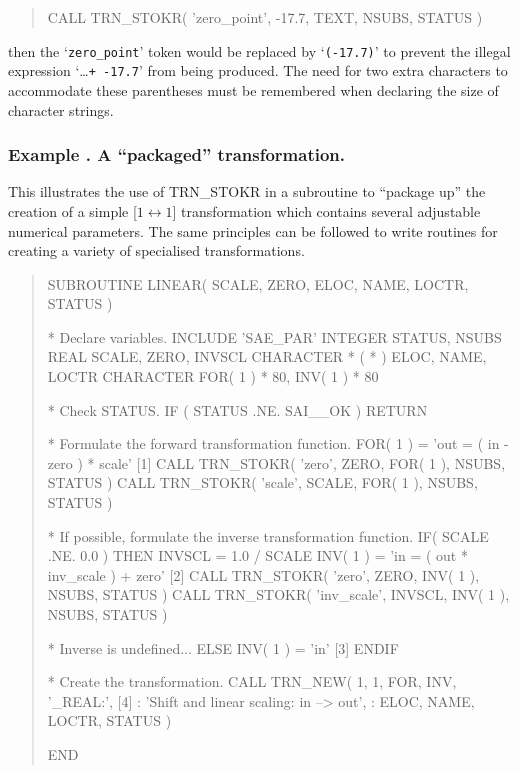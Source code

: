 \documentclass[twoside,nolof,11pt]{starlink}
\providecommand{\name}[1]{\small{#1}}
\newcounter{examplecounter}
\providecommand{\example}[1]{\addtocounter{examplecounter}{1}
                         \subsubsection*{Example \theexamplecounter. #1}}
\begin{document}
\begin{quote}
\begin{terminalv}
CALL TRN_STOKR( 'zero_point', -17.7, TEXT, NSUBS, STATUS )
\end{terminalv}
\end{quote}

then the `\verb#zero_point#' token would be replaced by `\verb#(-17.7)#' to
prevent the illegal expression \mbox{`\ldots \texttt{+ -17.7}'} from being
produced.
The need for two extra characters to accommodate these parentheses must be
remembered when declaring the size of character strings.

\example{A ``packaged'' transformation.}
This illustrates the use of \name{TRN\_STOKR} in a subroutine to
``package up'' the creation of a simple \mbox{[$1 \leftrightarrow 1$]}
transformation which contains several adjustable numerical parameters.
The same principles can be followed to write routines for creating a variety
of specialised transformations.

\begin{quote}
\begin{terminalv}
      SUBROUTINE LINEAR( SCALE, ZERO, ELOC, NAME, LOCTR, STATUS )

*  Declare variables.
      INCLUDE 'SAE_PAR'
      INTEGER STATUS, NSUBS
      REAL SCALE, ZERO, INVSCL
      CHARACTER * ( * ) ELOC, NAME, LOCTR
      CHARACTER FOR( 1 ) * 80, INV( 1 ) * 80

*  Check STATUS.
      IF ( STATUS .NE. SAI__OK ) RETURN

*  Formulate the forward transformation function.
      FOR( 1 ) = 'out = ( in - zero ) * scale'                 [1]
      CALL TRN_STOKR( 'zero', ZERO, FOR( 1 ), NSUBS, STATUS )
      CALL TRN_STOKR( 'scale', SCALE, FOR( 1 ), NSUBS, STATUS )

*  If possible, formulate the inverse transformation function.
      IF( SCALE .NE. 0.0 ) THEN
         INVSCL = 1.0 / SCALE
         INV( 1 ) = 'in = ( out * inv_scale ) + zero'          [2]
         CALL TRN_STOKR( 'zero', ZERO, INV( 1 ), NSUBS, STATUS )
         CALL TRN_STOKR( 'inv_scale', INVSCL, INV( 1 ), NSUBS, STATUS )

*  Inverse is undefined...
      ELSE
         INV( 1 ) = 'in'                                       [3]
      ENDIF

*  Create the transformation.
      CALL TRN_NEW( 1, 1, FOR, INV, '_REAL:',                  [4]
     :              'Shift and linear scaling: in --> out',
     :              ELOC, NAME, LOCTR, STATUS )

      END

\end{terminalv}
\end{quote}
\end{document}
